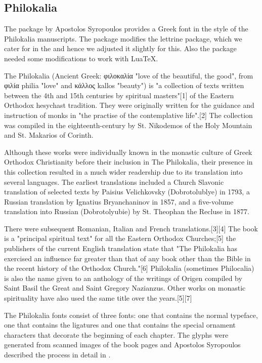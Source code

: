 %

\subsection{Philokalia}

The  package by Apostolos Syropoulos provides a Greek font in the style of the Philokalia manuscripts. The package modifies the lettrine package, which we cater for in the  and hence we adjusted it slightly for this. Also the package needed some modifications to work with LuaTeX.

The Philokalia (Ancient Greek: φιλοκαλία "love of the beautiful, the good", from φιλία philia "love" and κάλλος kallos "beauty") is "a collection of texts written between the 4th and 15th centuries by spiritual masters"[1] of the Eastern Orthodox hesychast tradition. They were originally written for the guidance and instruction of monks in "the practise of the contemplative life".[2] The collection was compiled in the eighteenth-century by St. Nikodemos of the Holy Mountain and St. Makarios of Corinth.

Although these works were individually known in the monastic culture of Greek Orthodox Christianity before their inclusion in The Philokalia, their presence in this collection resulted in a much wider readership due to its translation into several languages. The earliest translations included a Church Slavonic translation of selected texts by Paisius Velichkovsky (Dobrotolublye) in 1793, a Russian translation by Ignatius Bryanchaninov in 1857, and a five-volume translation into Russian (Dobrotolyubie) by St. Theophan the Recluse in 1877.

There were subsequent Romanian, Italian and French translations.[3][4]
The book is a "principal spiritual text" for all the Eastern Orthodox Churches;[5] the publishers of the current English translation state that "The Philokalia has exercised an influence far greater than that of any book other than the Bible in the recent history of the Orthodox Church."[6]
Philokalia (sometimes Philocalia) is also the name given to an anthology of the writings of Origen compiled by Saint Basil the Great and Saint Gregory Nazianzus. Other works on monastic spirituality have also used the same title over the years.[5][7]

The Philokalia fonts consist of three fonts: one that contains
the normal typeface, one that contains the ligatures and one that contains the special ornament characters that decorate the beginning of each chapter. The glyphs were generated from scanned images of the book pages and Apostolos Syropoulos described the process in detail in \cite{syropoulos}. 


